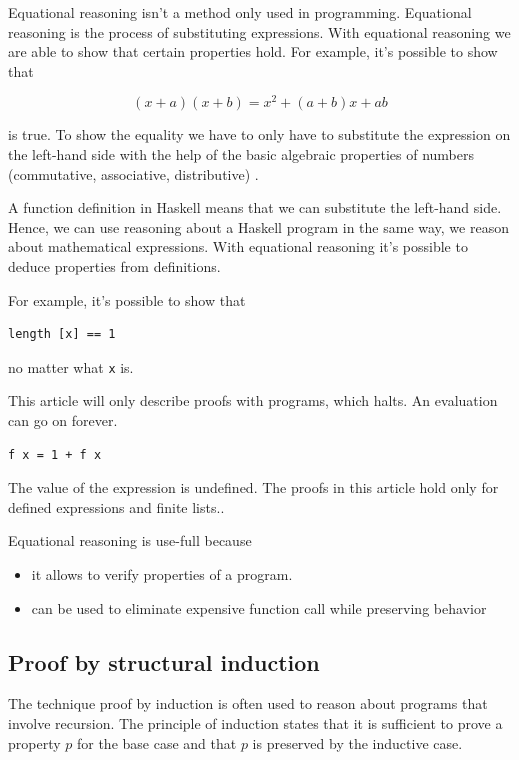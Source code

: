\documentclass[twoside, a4paper, 12pt]{article}
\begin{document}
Equational reasoning isn't a method only used in programming. Equational reasoning is the process of substituting expressions. With equational reasoning we are able to show that certain properties hold.
For example, it's possible to show that

\begin{equation}
  \label{eq:sum}
  (x+a)(x+b) = x^2 + (a+b)x+ab
\end{equation}

is true. To show the equality we have to only have to substitute the expression on the left-hand side with the help of the basic algebraic properties of numbers (commutative, associative, distributive) \cite{hutton}.

A function definition in Haskell means that we can substitute the left-hand side. Hence, we can use reasoning about a Haskell program in the same way, we reason about mathematical expressions. With equational reasoning it's possible to deduce properties from definitions.

For example, it's possible to show that 
\begin{verbatim}
length [x] == 1
\end{verbatim}
no matter what \verb|x| is.

This article will only describe proofs with programs, which halts. An evaluation can go on forever.
\begin{verbatim}
f x = 1 + f x
\end{verbatim}

The value of the expression is undefined. The proofs in this article hold only for defined expressions and finite lists..

Equational reasoning is use-full because
\begin{itemize}
\item it allows to verify properties of a program.
\item can be used to eliminate expensive function call while preserving behavior
\end{itemize}

\subsection{Proof by structural induction}
\label{sec:induction}

The technique proof by induction is often used to reason about programs that involve recursion. The principle of induction states that it is sufficient to prove a property $p$ for the base case and that $p$ is preserved by the inductive case.
\end{document}
